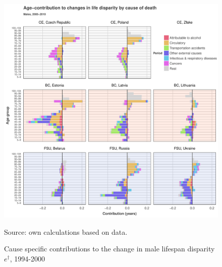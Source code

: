 \documentclass{article}
\begin{document}
\newpage

\begin{figure}[h!]
\caption{Cause specific contributions to the change in  male lifespan disparity  $e^\dagger$, 1994-2000}
\label{Males_causes_1994}
\centering
\begin{center}
\includegraphics[scale=.70]{Figures/Figure_5.pdf}
\end{center}
Source: own calculations based on \citet{HcO} data. 
\end{figure}

\newpage
\end{document}

